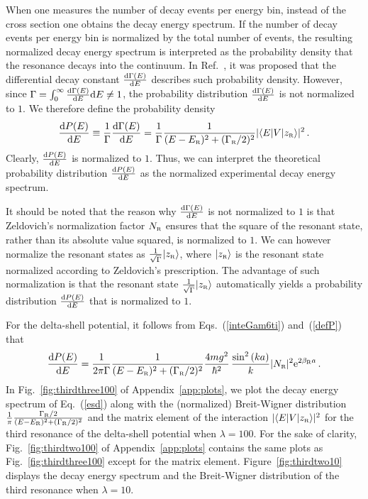 \documentclass[12pt]{article}
\newcommand{\rme}{{\rm e}}
\newcommand{\rmd}{{\rm d}}
\newcommand{\gs}{|z_{\text{\tiny R}}\rangle}
\newcommand{\zr}{z_{\text{\tiny R}}}
\newcommand{\gr}{\Gamma _{\text{\tiny R}}}
\newcommand{\er}{E_{\text{\tiny R}}}
\newcommand{\nr}{N_{\text{\tiny R}}}
\newcommand{\br}{\beta_{\text{\tiny R}}}
\begin{document}
When one measures the number of decay events per energy bin, instead of the 
cross section one obtains the decay energy spectrum. If the 
number of decay events per energy bin is normalized by
the total number of events, the resulting normalized decay energy spectrum
is interpreted as the probability density that the
resonance decays into the continuum. In Ref.~\cite{NPA15}, it was proposed 
that the differential decay constant $\frac{\rmd \Gamma (E)}{\rmd E}$ 
describes such probability density. However, since 
$\Gamma = \int_0^{\infty}\frac{\rmd \Gamma (E)}{\rmd E} \rmd E \neq 1$, the
probability distribution $\frac{\rmd \Gamma (E)}{\rmd E}$ is not normalized 
to $1$. We therefore define the probability density
\begin{equation}
     \frac{\rmd P (E)}{\rmd E} \equiv
   \frac{1}{\Gamma} \frac{\rmd \Gamma (E)}{\rmd E}=\frac{1}{\Gamma}
    \frac{1}{(E-\er)^2+(\gr/2)^2} |\langle E|V \gs|^2  \, .
        \label{defP}
\end{equation}
Clearly, $\frac{\rmd P (E)}{\rmd E}$ is normalized to $1$. Thus,
we can interpret the theoretical probability distribution 
$\frac{\rmd P (E)}{\rmd E}$ as the normalized experimental decay 
energy spectrum.

It should be noted that the
reason why $\frac{\rmd \Gamma (E)}{\rmd E}$ is not normalized to $1$ is that
Zeldovich's normalization factor $\nr$ ensures that the square of the resonant
state, rather than its absolute value squared, is normalized to $1$. We can
however normalize the resonant states as 
$\frac{1}{\sqrt{\Gamma}}|\zr \rangle$, 
where $|\zr \rangle$ is the resonant state normalized according to
Zeldovich's prescription. The advantage of such normalization is that
the resonant state $\frac{1}{\sqrt{\Gamma}}|\zr \rangle$ automatically 
yields a probability distribution $\frac{\rmd P (E)}{\rmd E}$ that is 
normalized to $1$.

For the delta-shell potential, it follows from Eqs.~(\ref{inteGam6ti})
and~(\ref{defP}) that 
\begin{equation}
        \frac{\rmd P (E)}{\rmd E} = \frac{1}{2\pi\Gamma}
       \frac{1}{(E-\er)^2+(\gr /2)^2} 
        \frac{4mg^2}{\hbar ^2} \,
      \frac{\sin ^2\left(k a \right)}{k} |\nr|^2 \rme^{2\br a}    \, .
      \label{esd}
\end{equation}
In Fig.~\ref{fig:thirdthree100} of Appendix~\ref{app:plots}, we plot 
the decay energy spectrum of
Eq.~(\ref{esd}) along with the (normalized) Breit-Wigner distribution
$\frac{1}{\pi}\frac{\gr/2}{(E-\er)^2+(\gr /2)^2}$
and the matrix element of the interaction $|\langle E|V|\zr \rangle |^2$ for
the third resonance of the delta-shell potential when
$\lambda =100$. For the sake of clarity, Fig.~\ref{fig:thirdtwo100} 
of Appendix~\ref{app:plots} contains
the same plots as Fig.~\ref{fig:thirdthree100} except for the matrix 
element. Figure~\ref{fig:thirdtwo10} displays the decay energy spectrum 
and the Breit-Wigner distribution of the third resonance
when $\lambda =10$.
\end{document}
